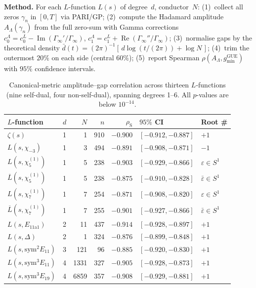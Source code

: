 \documentclass[11pt,a4paper]{article}
\theoremstyle{plain}
\theoremstyle{definition}
\DeclareMathOperator{\GUE}{GUE}
\newcommand{\La}{\Lambda}
\begin{document}
\medskip\noindent\textbf{Method.}\;
For each $L$-function $L(s)$ of degree~$d$, conductor~$N$:
(1)~collect all zeros $\gamma_n$ in $[0, T]$ via \textsc{PARI/GP};
(2)~compute the Hadamard amplitude $A_\La(\gamma_n)$ from the
full zero-sum with Gamma corrections
$c_0^\La = c_0^L - \operatorname{Im}(\Gamma_\infty'/\Gamma_\infty)$,
$c_1^\La = c_1^L + \operatorname{Re}(\Gamma_\infty''/\Gamma_\infty)$;
(3)~normalise gaps by the theoretical density
$\bar{d}(t) = (2\pi)^{-1}[\,d\log(t/(2\pi)) + \log N\,]$;
(4)~trim the outermost $20\%$ on each side (central $60\%$);
(5)~report Spearman $\rho(A_\La, g_{\min}^{\GUE})$ with
$95\%$ confidence intervals.

\begin{table}[h]
\centering
\caption{Canonical-metric amplitude--gap correlation across thirteen
$L$-functions (nine self-dual, four non-self-dual), spanning
degrees 1--6.
All $p$-values are below $10^{-14}$.}
\label{tab:canonical}
\small
\begin{tabular}{llrrrll}
\toprule
\textbf{$L$-function} & $d$ & $N$ & $n$ &
$\rho_{\mathrm{S}}$ & \textbf{$95\%$ CI} & \textbf{Root \#} \\
\midrule
$\zeta(s)$            & 1 & 1   & 910 & $-0.900$ & $[-0.912,-0.887]$ & $+1$ \\
$L(s,\chi_{-3})$      & 1 & 3   & 494 & $-0.891$ & $[-0.908,-0.871]$ & $-1$ \\
$L(s,\chi_{5}^{(1)})$ & 1 & 5   & 238 & $-0.903$ & $[-0.929,-0.866]$ & $\varepsilon \in S^1$ \\
$\overline{L}(s,\chi_{5}^{(1)})$ & 1 & 5 & 238 & $-0.875$ & $[-0.910,-0.828]$ & $\bar{\varepsilon} \in S^1$ \\
$L(s,\chi_{7}^{(1)})$ & 1 & 7   & 254 & $-0.871$ & $[-0.908,-0.820]$ & $\varepsilon \in S^1$ \\
$\overline{L}(s,\chi_{7}^{(1)})$ & 1 & 7 & 255 & $-0.901$ & $[-0.927,-0.866]$ & $\bar{\varepsilon} \in S^1$ \\
$L(s,E_{11\mathrm{a}1})$ & 2 & 11  & 437 & $-0.914$ & $[-0.928,-0.897]$ & $+1$ \\
$L(s,\Delta)$         & 2 & 1   & 324 & $-0.876$ & $[-0.899,-0.848]$ & $+1$ \\
$L(s,\mathrm{sym}^2 E_{11})$ & 3 & 121 & 96 & $-0.885$ & $[-0.920,-0.830]$ & $+1$ \\
$L(s,\mathrm{sym}^3 E_{11})$ & 4 & 1331 & 327 & $-0.905$ & $[-0.928,-0.873]$ & $+1$ \\
$L(s,\mathrm{sym}^3 E_{19})$ & 4 & 6859 & 357 & $-0.908$ & $[-0.929,-0.881]$ & $+1$ \\

\end{tabular}
\end{table}
\end{document}
